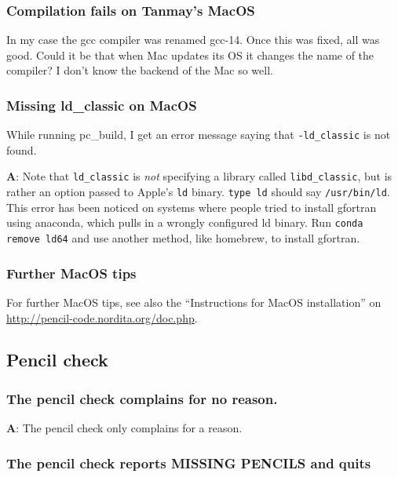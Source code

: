 \documentclass[\mydriver,12pt,twoside,notitlepage,a4paper]{article}
\makeatletter
\newcommand{\code}[1]{\texttt{#1}}
\newcommand{\cmd}{\command}
\newcommand{\command}[2][]{%
  \def\index@{#1}%
  \code{#2}%
  \ifx\index@\@empty\index{#2@\emph{#2}}%
  \else\index{#1@\emph{#1}}%
  \fi%
}
\makeatother
\begin{document}
\subsubsection{Compilation fails on Tanmay's MacOS}

In my case the gcc compiler was renamed gcc-14. Once this was fixed,
all was good. Could it be that when Mac updates its OS it changes the
name of the compiler?
I don't know the backend of the Mac so well.


\subsubsection{Missing ld\_classic on MacOS}

While running pc_build, I get an error message saying that \code{-ld\_classic} is not found.

{\bf A}:
Note that \code{ld\_classic} is \emph{not} specifying a library called \code{libd\_classic}, but is rather an option passed to Apple's \code{ld} binary.
\cmd{type ld} should say \code{/usr/bin/ld}.
This error has been noticed on systems where people tried to install gfortran using anaconda, which pulls in a wrongly configured ld binary.
Run \code{conda remove ld64} and use another method, like homebrew, to install gfortran.

\subsubsection{Further MacOS tips}

For further MacOS tips, see also the ``Instructions for MacOS installation'' on
\url{http://pencil-code.nordita.org/doc.php}.

\subsection{Pencil check}

\subsubsection{The pencil check complains for no reason.}

\medskip

{\bf A}: The pencil check only complains for a reason.

\subsubsection{The pencil check reports MISSING PENCILS and quits}
\end{document}
